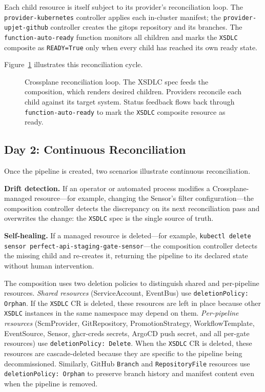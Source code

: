 Each child resource is itself subject to its provider's reconciliation loop. The \texttt{provider-kubernetes} controller applies each in-cluster manifest; the \texttt{provider-upjet-github} controller creates the gitops repository and its branches. The \texttt{function-auto-ready} function monitors all children and marks the \texttt{XSDLC} composite as \texttt{READY=True} only when every child has reached its own ready state.

Figure~\ref{fig:crossplane-reconciliation-loop} illustrates this reconciliation cycle.

\begin{figure}[htbp]
\centering
\resizebox{0.85\textwidth}{!}{%
%
}
\caption{Crossplane reconciliation loop. The XSDLC spec feeds the composition, which renders desired children. Providers reconcile each child against its target system. Status feedback flows back through \texttt{function-auto-ready} to mark the \texttt{XSDLC} composite resource as ready.}
\label{fig:crossplane-reconciliation-loop}
\end{figure}

\subsection{Day 2: Continuous Reconciliation}
\label{subsec:day2}

Once the pipeline is created, two scenarios illustrate continuous reconciliation.

\textbf{Drift detection.} If an operator or automated process modifies a Crossplane-managed resource---for example, changing the Sensor's filter configuration---the composition controller detects the discrepancy on its next reconciliation pass and overwrites the change: the \texttt{XSDLC} spec is the single source of truth.

\textbf{Self-healing.} If a managed resource is deleted---for example, \texttt{kubectl delete sensor perfect-api-staging-gate-sensor}---the composition controller detects the missing child and re-creates it, returning the pipeline to its declared state without human intervention.

The composition uses two deletion policies to distinguish shared and per-pipeline resources. \textit{Shared resources} (ServiceAccount, EventBus) use \texttt{deletionPolicy: Orphan}. If the \texttt{XSDLC} CR is deleted, these resources are left in place because other \texttt{XSDLC} instances in the same namespace may depend on them. \textit{Per-pipeline resources} (ScmProvider, GitRepository, PromotionStrategy, WorkflowTemplate, EventSource, Sensor, ghcr-creds secrets, ArgoCD push secret, and all per-gate resources) use \texttt{deletionPolicy: Delete}. When the \texttt{XSDLC} CR is deleted, these resources are cascade-deleted because they are specific to the pipeline being decommissioned. Similarly, GitHub \texttt{Branch} and \texttt{RepositoryFile} resources use \texttt{deletionPolicy: Orphan} to preserve branch history and manifest content even when the pipeline is removed.

